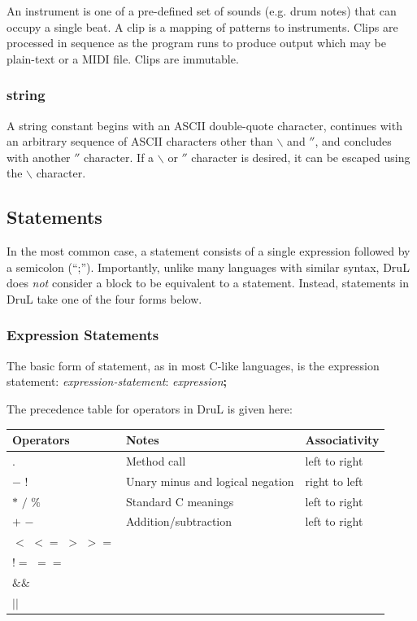 \documentclass[11pt,twoside]{article}
\begin{document}
An instrument is one of a pre-defined set of sounds (e.g. drum notes) that can occupy a single beat.
A clip is a mapping of patterns to instruments. Clips are processed in sequence as the program runs to produce output which may be plain-text or a MIDI file.  Clips are immutable.

\subsubsection{string}

A string constant begins with an ASCII double-quote character, continues 
with an arbitrary sequence of ASCII characters other than $\backslash$ and $''$, 
and concludes with another $''$ character.  If a $\backslash$ or $''$ character is 
desired, it can be escaped using the $\backslash$ character.





\subsection{Statements}

In the most common case, a statement consists of a single expression followed by a semicolon (``;'').  Importantly, unlike many languages with similar syntax, DruL does \emph{not} consider a block to be equivalent to a statement.  Instead, statements in DruL take one of the four forms below.

\subsubsection{Expression Statements}

The basic form of statement, as in most C-like languages, is the expression statement: \emph{expression-statement}: \emph{expression}\textbf{;}

The precedence table for operators in DruL is given here:

\begin{tabular}{ l |l| l}
\hline\hline
Operators         & Notes                            & Associativity \\
\hline $ . $      & Method call                      & left to right \\
$-$  $!$          & Unary minus and logical negation & right to left \\
$*$ $/$ $\%$      & Standard C meanings              & left to right \\
$+$ $-$           & Addition/subtraction             & left to right \\
$<$ $<=$ $>$ $>=$ &                                  &               \\
$!=$ $==$         &                                  &               \\
$\&\&$            &                                  &               \\
$||$              &                                  &
\end{tabular}
\end{document}
